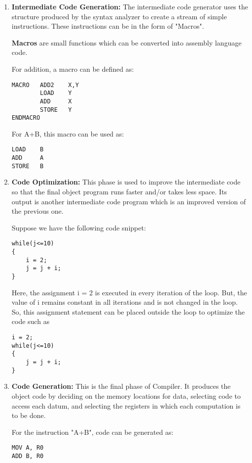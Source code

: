 \begin{enumerate}
\item \textbf{Intermediate Code Generation:} The intermediate code generator uses the structure produced by the syntax analyzer to create a stream of simple instructions. These instructions can be in the form of "Macros".

\textbf{Macros} are small functions which can be converted into assembly language code.
\begin{example}
For addition, a macro can be defined as:
\begin{verbatim}
MACRO   ADD2    X,Y
        LOAD    Y
        ADD     X
        STORE   Y
ENDMACRO
\end{verbatim}
For A+B, this macro can be used as:
\begin{verbatim}
LOAD    B
ADD     A
STORE   B
\end{verbatim}
\end{example}

\item \textbf{Code Optimization:} This phase is used to improve the intermediate code so that the final object program runs faster and/or takes less space. Its output is another intermediate code program which is an improved version of the previous one.
\begin{example}
Suppose we have the following code snippet:
\begin{verbatim}
while(j<=10)
{
    i = 2;
    j = j + i;
}
\end{verbatim}

Here, the assignment i = 2 is executed in every iteration of the loop. But, the value of i remains constant in all iterations and is not changed in the loop. So, this assignment statement can be placed outside the loop to optimize the code such as
\begin{verbatim}
i = 2;
while(j<=10)
{
    j = j + i;
}
\end{verbatim}
\end{example}

\item \textbf{Code Generation:} This is the final phase of Compiler. It produces the object code by deciding on the memory locations for data, selecting code to access each datum, and selecting the registers in which each computation is to be done.
\begin{example}
For the instruction "A+B", code can be generated as:
\begin{verbatim}
MOV A, R0
ADD B, R0
\end{verbatim}
\end{example}


\end{enumerate}
